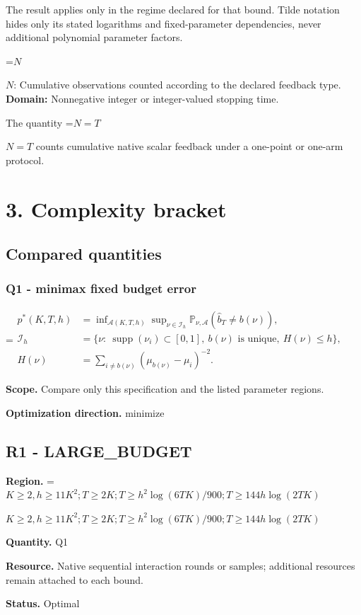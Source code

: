 \documentclass[10pt,a4paper]{article}
\newcommand{\AtlasMath}[1]{\par\begingroup\centering\setbox0=\hbox{$\displaystyle #1$}\ifdim\wd0>1.4\linewidth\typeout{ATLAS WIDE FORMULA: \the\wd0}\fi\ifdim\wd0>\linewidth\resizebox{\linewidth}{!}{\box0}\else\box0\fi\par\endgroup}
\newcommand{\AtlasInlineMath}[1]{\begingroup\setbox0=\hbox{$#1$}\ifdim\wd0>.4\linewidth\endgroup\AtlasMath{#1}\else\endgroup$#1$\fi}
\begin{document}
The result applies only in the regime declared for that bound. Tilde notation hides only its stated logarithms and fixed-parameter dependencies, never additional polynomial parameter factors.

\AtlasInlineMath{N}: Cumulative observations counted according to the declared feedback type. \textbf{Domain:} Nonnegative integer or integer-valued stopping time.

The quantity \AtlasInlineMath{N=T} counts cumulative native scalar feedback under a one-point or one-arm protocol.

\section{3. Complexity bracket}
\subsection{Compared quantities}
\subsubsection{Q1 - minimax fixed budget error}
\AtlasMath{\begin{aligned} p^*(K,T,h)&=\inf_{\mathcal A(K,T,h)}\sup_{\nu\in\mathcal I_h}\mathbb P_{\nu,\mathcal A}(\widehat b_T\ne b(\nu)),\\ \mathcal I_h&=\{\nu:\ \operatorname{supp}(\nu_i)\subset[0,1],\ b(\nu)\text{ is unique},\ H(\nu)\le h\},\\ H(\nu)&=\sum_{i\ne b(\nu)}(\mu_{b(\nu)}-\mu_i)^{-2}.\end{aligned}}
\textbf{Scope.} Compare only this specification and the listed parameter regions.

\textbf{Optimization direction.} minimize

\subsection{R1 - LARGE\_BUDGET}
\textbf{Region.} \AtlasInlineMath{K\ge 2, h\ge 11K^2; T\ge 2K; T\ge h^2 \log(6TK)/900; T\ge 144h \log(2TK)}

\textbf{Quantity.} Q1

\textbf{Resource.} Native sequential interaction rounds or samples; additional resources remain attached to each bound.

\textbf{Status.} Optimal
\end{document}
